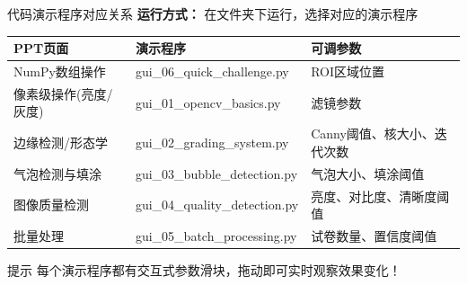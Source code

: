 \documentclass[aspectratio=169, 10pt]{beamer}
\begin{document}
\begin{frame}{代码演示程序对应关系}
    \textbf{运行方式：} 在文件夹下运行，选择对应的演示程序

    \vspace{0.3cm}

    \begin{table}
        \centering
        \small
        \begin{tabular}{lp{5cm}l}
            \toprule
            \textbf{PPT页面} & \textbf{演示程序} & \textbf{可调参数} \\
            \midrule
            NumPy数组操作 & gui\_06\_quick\_challenge.py & ROI区域位置 \\
            像素级操作(亮度/灰度) & gui\_01\_opencv\_basics.py & 滤镜参数 \\
            边缘检测/形态学 & gui\_02\_grading\_system.py & Canny阈值、核大小、迭代次数 \\
            气泡检测与填涂 & gui\_03\_bubble\_detection.py & 气泡大小、填涂阈值 \\
            图像质量检测 & gui\_04\_quality\_detection.py & 亮度、对比度、清晰度阈值 \\
            批量处理 & gui\_05\_batch\_processing.py & 试卷数量、置信度阈值 \\
            \bottomrule
        \end{tabular}
    \end{table}

    \vspace{0.3cm}

    \begin{alertblock}{提示}
        每个演示程序都有交互式参数滑块，拖动即可实时观察效果变化！
    \end{alertblock}
\end{frame}









\end{document}
